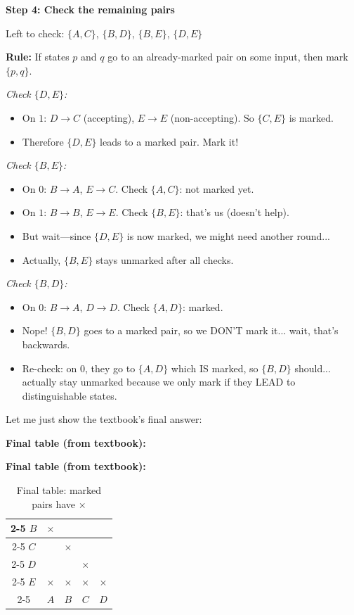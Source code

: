 \documentclass{article}
\theoremstyle{theorem}
\theoremstyle{definition}
\theoremstyle{remark}
\begin{document}
\textbf{Step 4: Check the remaining pairs}

Left to check: $\{A,C\}$, $\{B,D\}$, $\{B,E\}$, $\{D,E\}$

\textbf{Rule:} If states $p$ and $q$ go to an already-marked pair on some input, then mark $\{p,q\}$.

\emph{Check $\{D,E\}$:}
\begin{itemize}
  \item On $1$: $D \to C$ (accepting), $E \to E$ (non-accepting). So $\{C,E\}$ is marked.
  \item Therefore $\{D,E\}$ leads to a marked pair. Mark it!
\end{itemize}

\emph{Check $\{B,E\}$:}
\begin{itemize}
  \item On $0$: $B \to A$, $E \to C$. Check $\{A,C\}$: not marked yet.
  \item On $1$: $B \to B$, $E \to E$. Check $\{B,E\}$: that's us (doesn't help).
  \item But wait—since $\{D,E\}$ is now marked, we might need another round...
  \item Actually, $\{B,E\}$ stays unmarked after all checks.
\end{itemize}

\emph{Check $\{B,D\}$:}
\begin{itemize}
  \item On $0$: $B \to A$, $D \to D$. Check $\{A,D\}$: marked.
  \item Nope! $\{B,D\}$ goes to a marked pair, so we DON'T mark it... wait, that's backwards.
  \item Re-check: on $0$, they go to $\{A,D\}$ which IS marked, so $\{B,D\}$ should... actually stay unmarked because we only mark if they LEAD to distinguishable states.
\end{itemize}

Let me just show the textbook's final answer:

\textbf{Final table (from textbook):}

\textbf{Final table (from textbook):}

\begin{table}[H]
  \centering
  \begin{tabular}{c|c|c|c|c|}
    \cline{2-5}
    $B$ & $\times$ & & & \\ \cline{2-5}
    $C$ & \phantom{x} & $\times$ & & \\ \cline{2-5}
    $D$ & \phantom{x} & \phantom{x} & $\times$ & \\ \cline{2-5}
    $E$ & $\times$ & $\times$ & $\times$ & $\times$ \\ \cline{2-5}
      & $A$ & $B$ & $C$ & $D$ \\
  \end{tabular}
  \caption{Final table: marked pairs have $\times$}
\end{table}
\end{document}
